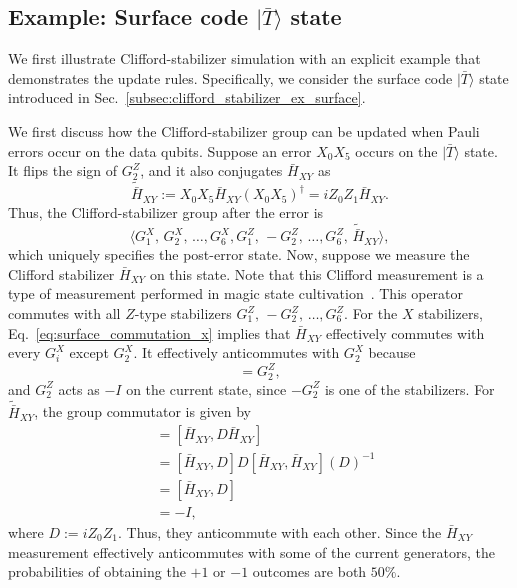\documentclass[
 reprint,
 amsmath,amssymb,
 pra,superscriptaddress, nofootinbib
]{revtex4-2}
\theoremstyle{definition}
\theoremstyle{plain}
\begin{document}
\subsection{Example:  Surface code \texorpdfstring{$|\bar{T}\rangle$ state}{|Tbar> state}}
\label{subsec:clifford_stb_update_ex_surface}
We first illustrate Clifford-stabilizer simulation with an explicit example that demonstrates the update rules. Specifically, we consider the surface code $|\bar{T}\rangle$ state introduced in Sec.~\ref{subsec:clifford_stabilizer_ex_surface}.  

We first discuss how the Clifford-stabilizer group can be updated when Pauli errors occur on the data qubits.  Suppose an error $X_0X_5$ occurs on the $|\bar{T}\rangle$ state. It flips the sign of $G^Z_2$, and it also conjugates $\bar{H}_{XY}$ as 
\begin{equation}
\widetilde{\bar{H}}_{XY}:=X_0X_5\bar{H}_{XY}(X_0X_5)^\dagger=iZ_0Z_1\bar{H}_{XY}.
\label{eq:h_xy_conjugate}
\end{equation}
Thus, the Clifford-stabilizer group after the error is 
\begin{equation}
\langle G^X_1,\, G^X_2,\,\ldots, G^X_6,G^Z_1,\, -G^Z_2,\,\ldots, G^Z_6, \,\widetilde{\bar{H}}_{XY}\rangle,
\end{equation}
which uniquely specifies the post-error state.
Now, suppose we measure the Clifford stabilizer $\bar{H}_{XY}$ on this state. Note that this Clifford measurement is a type of measurement performed in magic state cultivation~\cite{gpvl-lg4c}.
This operator commutes with all $Z$-type stabilizers $G^Z_1,\, -G^Z_2,\,\ldots, G^Z_6$.
For the $X$ stabilizers, Eq.~\eqref{eq:surface_commutation_x} implies that $\bar{H}_{XY}$ effectively commutes with every $G^X_i$ except $G^X_2$. It effectively anticommutes with $G^X_2$ because
\begin{equation}
[\bar{H}_{XY},G^X_2]=G^Z_2,
\end{equation}
and $G^Z_2$ acts as $-I$ on the current state, since $-G^Z_2$ is one of the stabilizers.
For $\widetilde{\bar{H}}_{XY}$, the group commutator is given by
\begin{align}
[\bar{H}_{XY},\widetilde{\bar{H}}_{XY}]&=[\bar{H}_{XY},D\bar{H}_{XY}]\\
&=[\bar{H}_{XY},D]D[\bar{H}_{XY},\bar{H}_{XY}](D)^{-1}\\
&=[\bar{H}_{XY},D]\\
&=-I,
\label{eq:surface_comm_h}
\end{align}
where $D:=iZ_0Z_1$.
Thus, they anticommute with each other. 
Since the $\bar{H}_{XY}$ measurement effectively anticommutes with some of the current generators, the probabilities of obtaining the $+1$ or $-1$ outcomes are both $50\%$.
\end{document}
